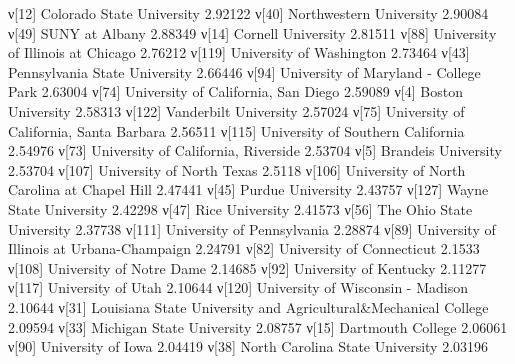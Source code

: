 ν[12]   Colorado State University                                        2.92122
ν[40]   Northwestern University                                          2.90084
ν[49]   SUNY at Albany                                                   2.88349
ν[14]   Cornell University                                               2.81511
ν[88]   University of Illinois at Chicago                                2.76212
ν[119]  University of Washington                                         2.73464
ν[43]   Pennsylvania State University                                    2.66446
ν[94]   University of Maryland - College Park                            2.63004
ν[74]   University of California, San Diego                              2.59089
ν[4]    Boston University                                                2.58313
ν[122]  Vanderbilt University                                            2.57024
ν[75]   University of California, Santa Barbara                          2.56511
ν[115]  University of Southern California                                2.54976
ν[73]   University of California, Riverside                              2.53704
ν[5]    Brandeis University                                              2.53704
ν[107]  University of North Texas                                        2.5118
ν[106]  University of North Carolina at Chapel Hill                      2.47441
ν[45]   Purdue University                                                2.43757
ν[127]  Wayne State University                                           2.42298
ν[47]   Rice University                                                  2.41573
ν[56]   The Ohio State University                                        2.37738
ν[111]  University of Pennsylvania                                       2.28874
ν[89]   University of Illinois at Urbana-Champaign                       2.24791
ν[82]   University of Connecticut                                        2.1533
ν[108]  University of Notre Dame                                         2.14685
ν[92]   University of Kentucky                                           2.11277
ν[117]  University of Utah                                               2.10644
ν[120]  University of Wisconsin - Madison                                2.10644
ν[31]   Louisiana State University and Agricultural&Mechanical College   2.09594
ν[33]   Michigan State University                                        2.08757
ν[15]   Dartmouth College                                                2.06061
ν[90]   University of Iowa                                               2.04419
ν[38]   North Carolina State University                                  2.03196
